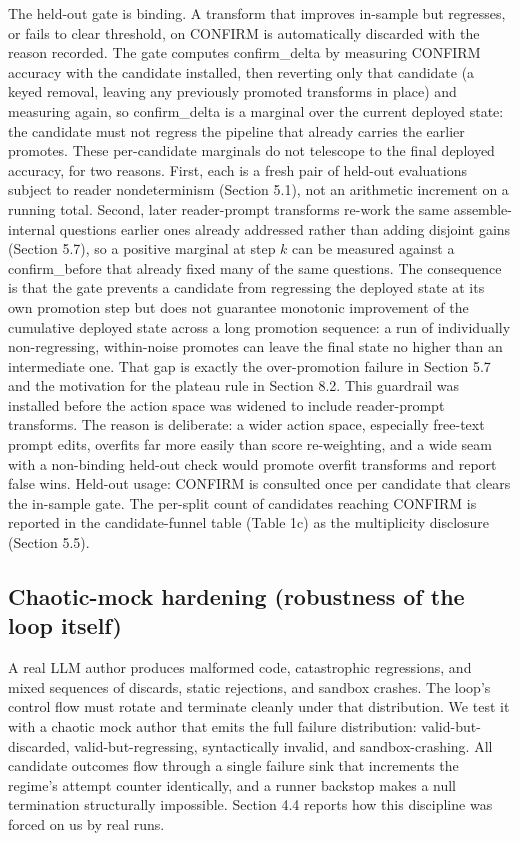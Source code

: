 The held-out gate is binding. A transform that improves in-sample but regresses, or fails to clear threshold, on CONFIRM is automatically discarded with the reason recorded. The gate computes confirm\_delta by measuring CONFIRM accuracy with the candidate installed, then reverting only that candidate (a keyed removal, leaving any previously promoted transforms in place) and measuring again, so confirm\_delta is a marginal over the current deployed state: the candidate must not regress the pipeline that already carries the earlier promotes. These per-candidate marginals do not telescope to the final deployed accuracy, for two reasons. First, each is a fresh pair of held-out evaluations subject to reader nondeterminism (Section 5.1), not an arithmetic increment on a running total. Second, later reader-prompt transforms re-work the same assemble-internal questions earlier ones already addressed rather than adding disjoint gains (Section 5.7), so a positive marginal at step $k$ can be measured against a confirm\_before that already fixed many of the same questions. The consequence is that the gate prevents a candidate from regressing the deployed state at its own promotion step but does not guarantee monotonic improvement of the cumulative deployed state across a long promotion sequence: a run of individually non-regressing, within-noise promotes can leave the final state no higher than an intermediate one. That gap is exactly the over-promotion failure in Section 5.7 and the motivation for the plateau rule in Section 8.2. This guardrail was installed before the action space was widened to include reader-prompt transforms. The reason is deliberate: a wider action space, especially free-text prompt edits, overfits far more easily than score re-weighting, and a wide seam with a non-binding held-out check would promote overfit transforms and report false wins. Held-out usage: CONFIRM is consulted once per candidate that clears the in-sample gate. The per-split count of candidates reaching CONFIRM is reported in the candidate-funnel table (Table 1c) as the multiplicity disclosure (Section 5.5).

\subsection{Chaotic-mock hardening (robustness of the loop itself)}

A real LLM author produces malformed code, catastrophic regressions, and mixed sequences of discards, static rejections, and sandbox crashes. The loop's control flow must rotate and terminate cleanly under that distribution. We test it with a chaotic mock author that emits the full failure distribution: valid-but-discarded, valid-but-regressing, syntactically invalid, and sandbox-crashing. All candidate outcomes flow through a single failure sink that increments the regime's attempt counter identically, and a runner backstop makes a null termination structurally impossible. Section 4.4 reports how this discipline was forced on us by real runs.


